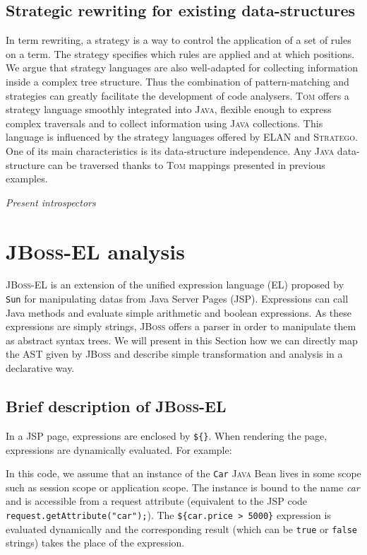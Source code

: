 \documentclass[runningheads]{llncs}
\newcommand{\jbossel}{\textsc{JBoss-EL}}
\newcommand{\jboss}{\textsc{JBoss}}
\newcommand{\jsp}{\textsc{JSP}}
\newcommand{\stratego}{\textsc{Stratego}}
\newcommand{\elan}    {\textsf{ELAN}\xspace}
\newcommand{\tom}{\textsc{Tom}}
\newcommand{\java}{\textsc{Java}}
\begin{document}
\subsection{Strategic rewriting for existing data-structures}

In term rewriting, a strategy is a way to control the application of a set of
rules on a term. The strategy specifies which rules are applied and at which
positions. We argue that strategy languages are also well-adapted for
collecting information inside a complex tree structure. Thus the combination of
pattern-matching and strategies can greatly facilitate the development of code
analysers. {\tom} offers a strategy language smoothly integrated into {\java},
flexible enough to express complex traversals and to collect information
using {\java} collections. This language is influenced by the strategy
languages offered by {\elan} and {\stratego}. One of its main characteristics
is its data-structure independence. Any {\java} data-structure can be
traversed thanks to {\tom} mappings presented in previous examples.

\emph{Present introspectors}

\section{{\jbossel} analysis}

{\jbossel} is an extension of the unified expression language (EL) proposed by
\texttt{Sun} for manipulating datas from Java Server Pages ({\jsp}).
Expressions can call Java methods and evaluate simple arithmetic and boolean
expressions. As these expressions are simply strings, {\jboss} offers a parser
in order to manipulate them as abstract syntax trees. We will present in this
Section how we can directly map the AST given by {\jboss} and describe simple
transformation and analysis in a declarative way.

\subsection{Brief description of {\jbossel}}

In a {\jsp} page, expressions are enclosed by \texttt{\$\{\}}. When rendering
the page, expressions are dynamically evaluated. For example:


In this code, we assume that an instance of the \verb+Car+ {\java} Bean lives
in some scope such as session scope or application scope.  The instance is
bound to the name \emph{car} and is accessible from a request attribute
(equivalent to the {\jsp} code \verb+request.getAttribute("car");+). The
\verb+${car.price > 5000}+ expression is evaluated dynamically and the
corresponding result (which can be \verb+true+ or \verb+false+ strings) takes
the place of the expression.
\end{document}
